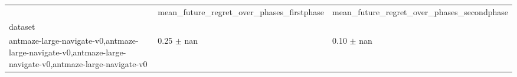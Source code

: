 \begin{tabular}{lll}
\toprule
 & mean_future_regret_over_phases_firstphase & mean_future_regret_over_phases_secondphase \\
dataset &  &  \\
\midrule
antmaze-large-navigate-v0,antmaze-large-navigate-v0,antmaze-large-navigate-v0,antmaze-large-navigate-v0 & 0.25 $\pm$ nan & 0.10 $\pm$ nan \\
\bottomrule
\end{tabular}

